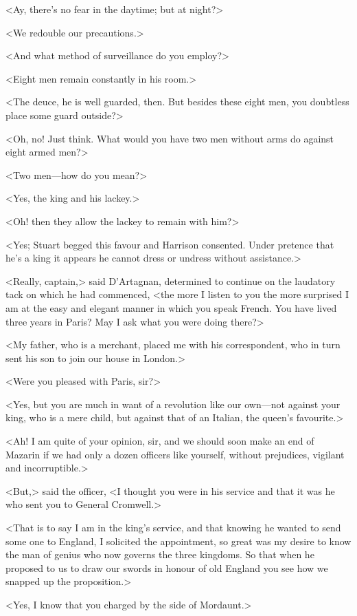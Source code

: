 <Ay, there's no fear in the daytime; but at night?>

<We redouble our precautions.>

<And what method of surveillance do you employ?>

<Eight men remain constantly in his room.>

<The deuce, he is well guarded, then. But besides these eight men, you doubtless place some guard outside?>

<Oh, no! Just think. What would you have two men without arms do against eight armed men?>

<Two men—how do you mean?>

<Yes, the king and his lackey.>

<Oh! then they allow the lackey to remain with him?>

<Yes; Stuart begged this favour and Harrison consented. Under pretence that he's a king it appears he cannot dress or undress without assistance.>

<Really, captain,> said D'Artagnan, determined to continue on the laudatory tack on which he had commenced, <the more I listen to you the more surprised I am at the easy and elegant manner in which you speak French. You have lived three years in Paris? May I ask what you were doing there?>

<My father, who is a merchant, placed me with his correspondent, who in turn sent his son to join our house in London.>

<Were you pleased with Paris, sir?>

<Yes, but you are much in want of a revolution like our own—not against your king, who is a mere child, but against that  of an Italian, the queen's favourite.>

<Ah! I am quite of your opinion, sir, and we should soon make an end of Mazarin if we had only a dozen officers like yourself, without prejudices, vigilant and incorruptible.>

<But,> said the officer, <I thought you were in his service and that it was he who sent you to General Cromwell.>

<That is to say I am in the king's service, and that knowing he wanted to send some one to England, I solicited the appointment, so great was my desire to know the man of genius who now governs the three kingdoms. So that when he proposed to us to draw our swords in honour of old England you see how we snapped up the proposition.>

<Yes, I know that you charged by the side of Mordaunt.>

